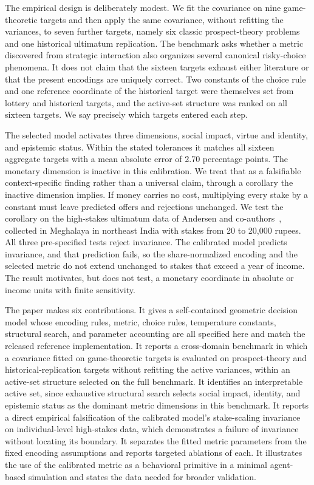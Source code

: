 \documentclass[journal]{IEEEtran}
\begin{document}
The empirical design is deliberately modest.
We fit the covariance on nine game-theoretic targets and then apply the same covariance, without refitting the variances, to seven further targets, namely six classic prospect-theory problems and one historical ultimatum replication.
The benchmark asks whether a metric discovered from strategic interaction also organizes several canonical risky-choice phenomena.
It does not claim that the sixteen targets exhaust either literature or that the present encodings are uniquely correct.
Two constants of the choice rule and one reference coordinate of the historical target were themselves set from lottery and historical targets, and the active-set structure was ranked on all sixteen targets.
We say precisely which targets entered each step.

The selected model activates three dimensions, social impact, virtue and identity, and epistemic status.
Within the stated tolerances it matches all sixteen aggregate targets with a mean absolute error of 2.70 percentage points.
The monetary dimension is inactive in this calibration.
We treat that as a falsifiable context-specific finding rather than a universal claim, through a corollary the inactive dimension implies.
If money carries no cost, multiplying every stake by a constant must leave predicted offers and rejections unchanged.
We test the corollary on the high-stakes ultimatum data of Andersen and co-authors~\cite{andersen2011}, collected in Meghalaya in northeast India with stakes from 20 to 20,000 rupees.
All three pre-specified tests reject invariance.
The calibrated model predicts invariance, and that prediction fails, so the share-normalized encoding and the selected metric do not extend unchanged to stakes that exceed a year of income.
The result motivates, but does not test, a monetary coordinate in absolute or income units with finite sensitivity.

The paper makes six contributions.
It gives a self-contained geometric decision model whose encoding rules, metric, choice rules, temperature constants, structural search, and parameter accounting are all specified here and match the released reference implementation.
It reports a cross-domain benchmark in which a covariance fitted on game-theoretic targets is evaluated on prospect-theory and historical-replication targets without refitting the active variances, within an active-set structure selected on the full benchmark.
It identifies an interpretable active set, since exhaustive structural search selects social impact, identity, and epistemic status as the dominant metric dimensions in this benchmark.
It reports a direct empirical falsification of the calibrated model's stake-scaling invariance on individual-level high-stakes data, which demonstrates a failure of invariance without locating its boundary.
It separates the fitted metric parameters from the fixed encoding assumptions and reports targeted ablations of each.
It illustrates the use of the calibrated metric as a behavioral primitive in a minimal agent-based simulation and states the data needed for broader validation.
\end{document}
